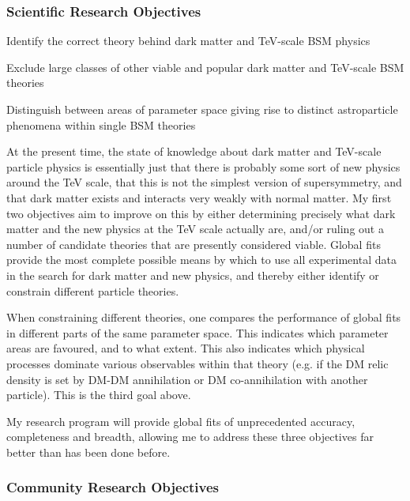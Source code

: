 \documentclass[a4paper,11pt]{article}
\begin{document}
\subsubsection{Scientific Research Objectives}
\label{objectives}

\begin{enumerate}
\setlength{\itemsep}{2pt}
{\it \item Identify the correct theory behind dark matter and TeV-scale BSM physics}
{\it \item Exclude large classes of other viable and popular dark matter and TeV-scale BSM theories}
{\it \item Distinguish between areas of parameter space giving rise to distinct astroparticle phenomena within single BSM theories}
\end{enumerate}

At the present time, the state of knowledge about dark matter and TeV-scale particle physics is essentially just that there is probably some sort of new physics around the TeV scale, that this is not the simplest version of supersymmetry, and that dark matter exists and interacts very weakly with normal matter.  My first two objectives aim to improve on this by either determining precisely what dark matter and the new physics at the TeV scale actually are, and/or ruling out a number of candidate theories that are presently considered viable.  Global fits provide the most complete possible means by which to use all experimental data in the search for dark matter and new physics, and thereby either identify or constrain different particle theories.  

When constraining different theories, one compares the performance of global fits in different parts of the same parameter space.  This indicates which parameter areas are favoured, and to what extent.  This also indicates which physical processes dominate various observables within that theory (e.g. if the DM relic density is set by DM-DM annihilation or DM co-annihilation with another particle).  This is the third goal above.

My research program will provide global fits of unprecedented accuracy, completeness and breadth, allowing me to address these three objectives far better than has been done before.

\subsubsection{Community Research Objectives}
\label{community}
\end{document}
